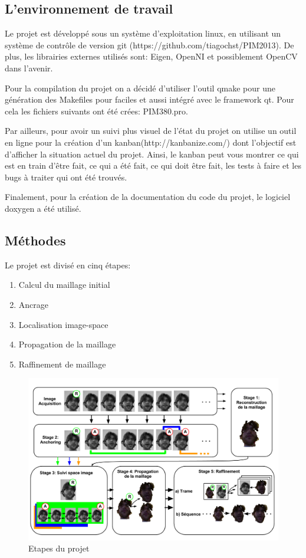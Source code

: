 \documentclass[a4paper,12pt]{article}
\begin{document}
\subsection{L'environnement de travail}

Le projet est développé sous un système d'exploitation linux, en
utilisant un système de contrôle de version git
(https://github.com/tiagochst/PIM2013).  
De plus, les librairies externes utilisés sont: Eigen, OpenNI et
possiblement OpenCV dans l’avenir. 

Pour la compilation du projet on a décidé d’utiliser l’outil qmake
pour une génération des Makefiles pour faciles et aussi intégré avec
le framework qt.  
Pour cela les fichiers suivants ont été crées: PIM380.pro. 

Par ailleurs, pour avoir un suivi plus visuel de l’état du projet on
utilise un outil en ligne pour la création d’un
kanban(http://kanbanize.com/) dont l’objectif est d’afficher la
situation actuel du projet. Ainsi, le kanban peut vous montrer ce qui
est en train d’être fait, ce qui a été fait, ce qui doit être fait,
les tests à faire et les bugs à traiter qui ont été trouvés. 

Finalement, pour la création de la documentation du code du projet, le
logiciel doxygen a été utilisé.  


\subsection{Méthodes}

Le projet est divisé en cinq étapes: 

\begin{enumerate}
\item Calcul du maillage initial
\item Ancrage
\item Localisation image-space
\item Propagation de la maillage
\item Raffinement de maillage
\end{enumerate}


\begin{figure}[h!]
  \begin{center}
    \includegraphics[scale=0.4]{img/projDiagram.png}
    \caption{Etapes du projet}
  \end{center}
\end{figure}
\end{document}
